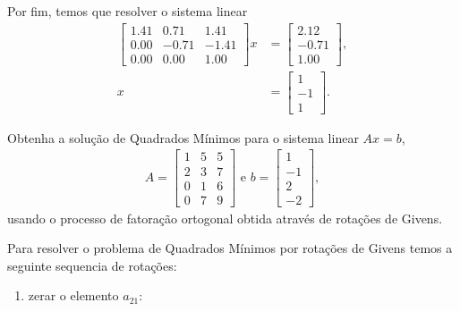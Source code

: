 \begin{questions}
\begin{solution}
        Por fim, temos que resolver o sistema linear
        \begin{align*}
            \begin{bmatrix}
                1.41 & 0.71 & 1.41 \\
                0.00 & -0.71 & -1.41 \\
                0.00 & 0.00 & 1.00
            \end{bmatrix} x &= \begin{bmatrix}
                2.12 \\
                -0.71 \\
                1.00
            \end{bmatrix}, \\
            x &= \begin{bmatrix}
                1 \\
                -1 \\
                1
            \end{bmatrix}.
        \end{align*}
    \end{solution}

    \question Obtenha a solu\c{c}\~{a}o de Quadrados M\'{i}nimos para o sistema linear $A x = b$,
    \begin{align*}
        A = \begin{bmatrix}
            1 & 5 & 5 \\
            2 & 3 & 7 \\
            0 & 1 & 6 \\
            0 & 7 & 9
        \end{bmatrix} \text{ e } b = \begin{bmatrix}
            1 \\
            -1 \\
            2 \\
            -2
        \end{bmatrix},
    \end{align*}
    usando o processo de fatora\c{c}\~{a}o ortogonal obtida atrav\'{e}s de rota\c{c}\~{o}es de Givens.
    \begin{solution}
        Para resolver o problema de Quadrados M\'{i}nimos por rota\c{c}\~{o}es de Givens temos a seguinte sequencia de rota\c{c}\~{o}es:
        \begin{enumerate}
            \item zerar o elemento $a_{21}$:


\end{enumerate}
\end{solution}
\end{questions}
